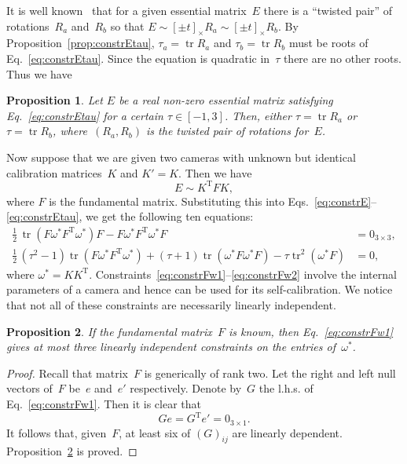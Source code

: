 \documentclass[reqno]{amsart}
\DeclareMathOperator{\tr}{tr}
\theoremstyle{plain}
\newtheorem{prop}{Proposition}
\begin{document}
It is well known~\cite{HZ,Maybank} that for a given essential matrix~$E$ there is a ``twisted pair'' of rotations~$R_a$ and~$R_b$ so that $E \sim [\pm t]_\times R_a \sim [\pm t]_\times R_b$. By Proposition~\ref{prop:constrEtau}, $\tau_a = \tr R_a$ and $\tau_b = \tr R_b$ must be roots of Eq.~\eqref{eq:constrEtau}. Since the equation is quadratic in~$\tau$ there are no other roots. Thus we have

\begin{prop}
\label{prop:constrEtau2}
Let $E$ be a real non-zero essential matrix satisfying Eq.~\eqref{eq:constrEtau} for a certain $\tau \in [-1, 3]$. Then, either $\tau = \tr R_a$ or $\tau = \tr R_b$, where~$(R_a, R_b)$ is the twisted pair of rotations for~$E$.
\end{prop}

Now suppose that we are given two cameras with unknown but identical calibration matrices~$K$ and $K' = K$. Then we have
\begin{equation}
\label{eq:FtoE}
E \sim K^{\mathrm T} F K,
\end{equation}
where $F$ is the fundamental matrix. Substituting this into Eqs.~\eqref{eq:constrE}--\eqref{eq:constrEtau}, we get the following ten equations:
\begin{align}
\label{eq:constrFw1}
\frac{1}{2}\,\tr(F\omega^*F^{\mathrm T}\omega^*)F - F\omega^*F^{\mathrm T}\omega^*F &= 0_{3\times 3},\\
\label{eq:constrFw2}
\frac{1}{2}\,(\tau^2 - 1)\tr(F\omega^*F^{\mathrm T}\omega^*) + (\tau + 1)\tr(\omega^*F\omega^*F) - \tau\tr^2(\omega^*F) &= 0,
\end{align}
where $\omega^* = KK^{\mathrm T}$. Constraints~\eqref{eq:constrFw1}--\eqref{eq:constrFw2} involve the internal parameters of a camera and hence can be used for its self-calibration. We notice that not all of these constraints are necessarily linearly independent.

\begin{prop}
\label{prop:4constr}
If the fundamental matrix~$F$ is known, then Eq.~\eqref{eq:constrFw1} gives at most three linearly independent constraints on the entries of~$\omega^*$.
\end{prop}

\begin{proof}
Recall that matrix~$F$ is generically of rank two. Let the right and left null vectors of~$F$ be~$e$ and~$e'$ respectively. Denote by~$G$ the l.h.s. of Eq.~\eqref{eq:constrFw1}. Then it is clear that
\begin{equation}
Ge = G^{\mathrm T}e' = 0_{3\times 1}.
\end{equation}
It follows that, given~$F$, at least six of $(G)_{ij}$ are linearly dependent. Proposition~\ref{prop:4constr} is proved.
\end{proof}
\end{document}
